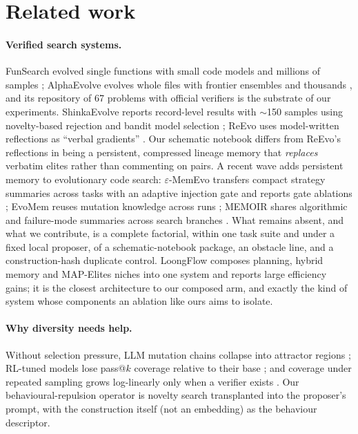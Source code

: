 \documentclass[11pt]{article}
\begin{document}
\section{Related work}
\label{sec:related}

\paragraph{Verified search systems.} FunSearch evolved single functions
with small code models and millions of samples
\citep{romeraparedes2024funsearch}; AlphaEvolve evolves whole files with
frontier ensembles and thousands \citep{novikov2025alphaevolve}, and its
repository of 67 problems with official verifiers
\citep{georgiev2025exploration} is the substrate of our experiments.
ShinkaEvolve reports record-level results with $\sim$150 samples using
novelty-based rejection and bandit model selection \citep{lange2025shinka};
ReEvo uses model-written reflections as ``verbal gradients''
\citep{ye2024reevo}. Our schematic notebook differs from ReEvo's
reflections in being a persistent, compressed lineage memory that
\emph{replaces} verbatim elites rather than commenting on pairs. A recent
wave adds persistent memory to evolutionary code search:
$\varepsilon$-MemEvo transfers compact strategy summaries across tasks
with an adaptive injection gate and reports gate ablations
\citep{liu2026memevo}; EvoMem reuses mutation knowledge across runs
\citep{volkov2026evomem}; MEMOIR shares algorithmic and failure-mode
summaries across search branches \citep{haji2026memoir}. What remains
absent, and what we contribute, is a complete factorial, within one task
suite and under a fixed local proposer, of a schematic-notebook package,
an obstacle line, and a construction-hash duplicate control. LoongFlow \citep{wan2025loongflow} composes planning, hybrid
memory and MAP-Elites niches into one system and reports large efficiency
gains; it is the closest architecture to our composed arm, and exactly the
kind of system whose components an ablation like ours aims to isolate.

\paragraph{Why diversity needs help.} Without selection pressure, LLM
mutation chains collapse into attractor regions \citep{gurkan2026mutation};
RL-tuned models lose pass@$k$ coverage relative to their base
\citep{yue2025rlvr}; and coverage under repeated sampling grows
log-linearly only when a verifier exists \citep{brown2024monkeys}. Our
behavioural-repulsion operator is novelty search
\citep{lehman2011novelty,mouret2015mapelites} transplanted into the
proposer's prompt, with the construction itself (not an embedding) as the
behaviour descriptor.
\end{document}
